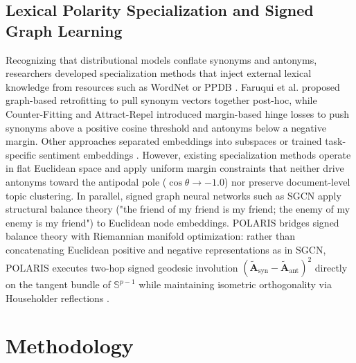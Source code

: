 \documentclass[journal]{IEEEtran}
\begin{document}
\subsection{Lexical Polarity Specialization and Signed Graph Learning}
Recognizing that distributional models conflate synonyms and antonyms, researchers developed specialization methods that inject external lexical knowledge from resources such as WordNet \cite{miller1995wordnet} or PPDB \cite{pavlick2015ppdb}. Faruqui et al. \cite{faruqui2015retrofitting} proposed graph-based retrofitting to pull synonym vectors together post-hoc, while Counter-Fitting \cite{mrksic2016counter} and Attract-Repel \cite{mrksic2017semantic} introduced margin-based hinge losses to push synonyms above a positive cosine threshold and antonyms below a negative margin. Other approaches separated embeddings into subspaces \cite{nguyen2016integrating} or trained task-specific sentiment embeddings \cite{tang2014learning}. However, existing specialization methods operate in flat Euclidean space and apply uniform margin constraints that neither drive antonyms toward the antipodal pole ($\cos\theta \to -1.0$) nor preserve document-level topic clustering. In parallel, signed graph neural networks such as SGCN \cite{derr2018signed} apply structural balance theory \cite{cartwright1956structural} ("the friend of my friend is my friend; the enemy of my enemy is my friend") to Euclidean node embeddings. POLARIS bridges signed balance theory with Riemannian manifold optimization: rather than concatenating Euclidean positive and negative representations as in SGCN, POLARIS executes two-hop signed geodesic involution $(\tilde{\mathbf{A}}_{\text{syn}} - \tilde{\mathbf{A}}_{\text{ant}})^2$ directly on the tangent bundle of $\mathbb{S}^{p-1}$ while maintaining isometric orthogonality via Householder reflections \cite{tomczak2016improving,mhammedi2017efficient}.

\section{Methodology}
\end{document}

